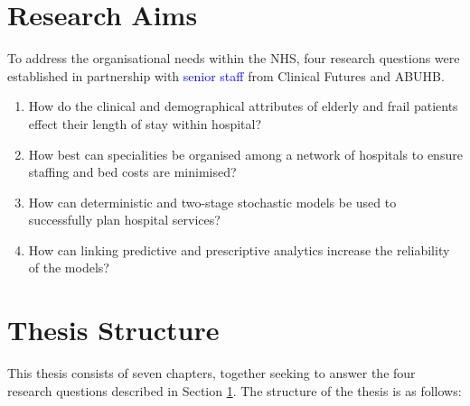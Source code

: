 \documentclass[../thesis.tex]{subfiles}
\begin{document}
\section{Research Aims}\label{sec:researchaims}
To address the organisational needs within the NHS, four research questions were established in partnership with \textcolor{blue}{senior staff} from Clinical Futures and ABUHB.

\begin{enumerate}
    \item How do the clinical and demographical attributes of elderly and frail patients effect their length of stay within hospital? 
    
    \item How best can specialities be organised among a network of hospitals to ensure staffing and bed costs are minimised? %
    
    \item How can deterministic and two-stage stochastic models be used to successfully plan hospital services?%
    \item How can linking predictive and prescriptive analytics increase the reliability of the models?
\end{enumerate}

\section{Thesis Structure}
This thesis consists of seven chapters, together seeking to answer the four research questions described in Section \ref{sec:researchaims}. The structure of the thesis is as follows:
\end{document}

